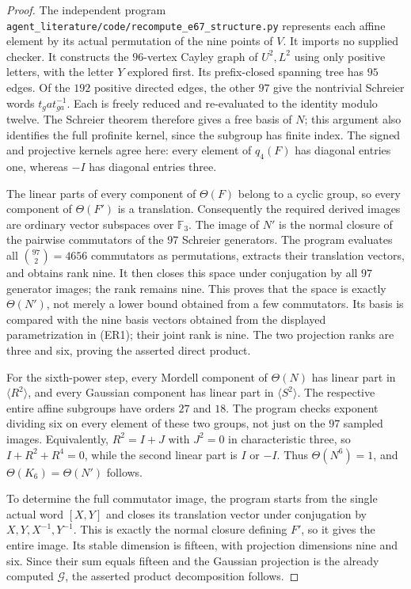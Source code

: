 \begin{proof}
The independent program
\texttt{agent\_literature/code/recompute\_e67\_structure.py}
represents each affine element by its actual permutation of the
nine points of $V$. It imports no supplied checker. It constructs
the $96$-vertex Cayley graph of $U^2,L^2$ using only positive
letters, with the letter $Y$ explored first. Its prefix-closed
spanning tree has $95$ edges. Of the $192$ positive directed
edges, the other $97$ give the nontrivial Schreier words
$t_g a t_{ga}^{-1}$. Each is freely reduced and re-evaluated to
the identity modulo twelve. The Schreier theorem therefore gives
a free basis of $N$; this argument also identifies the full
profinite kernel, since the subgroup has finite index.
The signed and projective kernels agree here: every element of
$q_4(F)$ has diagonal entries one, whereas $-I$ has diagonal
entries three.

The linear parts of every component of $\Theta(F)$ belong to
a cyclic group, so every component of $\Theta(F')$ is a
translation. Consequently the required derived images are
ordinary vector subspaces over $\mathbb F_3$. The image of
$N'$ is the normal closure of the pairwise commutators of the
$97$ Schreier generators. The program evaluates all
$\binom{97}{2}=4656$ commutators as permutations, extracts their
translation vectors, and obtains rank nine. It then closes this
space under conjugation by all $97$ generator images; the rank
remains nine. This proves that the space is exactly $\Theta(N')$,
not merely a lower bound obtained from a few commutators.
Its basis is compared with the nine basis vectors obtained from
the displayed parametrization in (ER1); their joint rank is nine.
The two projection ranks are three and six, proving the asserted
direct product.

For the sixth-power step, every Mordell component of
$\Theta(N)$ has linear part in $\langle R^2\rangle$, and every
Gaussian component has linear part in $\langle S^2\rangle$.
The respective entire affine subgroups have orders $27$ and $18$.
The program checks exponent dividing six on every element of
these two groups, not just on the $97$ sampled images.
Equivalently, $R^2=I+J$ with $J^2=0$ in characteristic three,
so $I+R^2+R^4=0$, while the second linear part is $I$ or $-I$.
Thus $\Theta(N^6)=1$, and $\Theta(K_6)=\Theta(N')$ follows.

To determine the full commutator image, the program starts from
the single actual word $[X,Y]$ and closes its translation vector
under conjugation by $X,Y,X^{-1},Y^{-1}$. This is exactly the
normal closure defining $F'$, so it gives the entire image.
Its stable dimension is fifteen, with projection dimensions
nine and six. Since their sum equals fifteen and the Gaussian
projection is the already computed $\mathcal G$, the asserted
product decomposition follows.


\end{proof}
